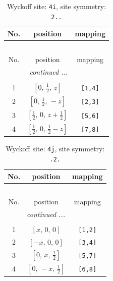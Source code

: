 \documentclass[fleqn,8pt]{jsarticle}
\begin{document}
\renewcommand{\arraystretch}{1.2}
\begin{longtable}{ccc}
\caption{Wyckoff site: {\tt 4i}, site symmetry: {\tt 2..}}
 \\
 \hline \hline
No. & position & mapping \\ \hline \endfirsthead

\multicolumn{2}{l}{\tablename\ \thetable{}} \\
 \hline \hline
No. & position & mapping \\ \hline \endhead

 \hline \hline
\multicolumn{2}{r}{\footnotesize\it continued ...} \\ \endfoot

 \hline \hline
\multicolumn{2}{r}{} \\ \endlastfoot

1 & $\left[ 0,\, \frac{1}{2},\, z \right]$ & {\tt [1,4]} \\ \hline
2 & $\left[ 0,\, \frac{1}{2},\, - z \right]$ & {\tt [2,3]} \\ \hline
3 & $\left[ \frac{1}{2},\, 0,\, z + \frac{1}{2} \right]$ & {\tt [5,6]} \\ \hline
4 & $\left[ \frac{1}{2},\, 0,\, \frac{1}{2} - z \right]$ & {\tt [7,8]} \\
\end{longtable}
\renewcommand{\arraystretch}{1.2}
\begin{longtable}{ccc}
\caption{Wyckoff site: {\tt 4j}, site symmetry: {\tt .2.}}
 \\
 \hline \hline
No. & position & mapping \\ \hline \endfirsthead

\multicolumn{2}{l}{\tablename\ \thetable{}} \\
 \hline \hline
No. & position & mapping \\ \hline \endhead

 \hline \hline
\multicolumn{2}{r}{\footnotesize\it continued ...} \\ \endfoot

 \hline \hline
\multicolumn{2}{r}{} \\ \endlastfoot

1 & $\left[ x,\, 0,\, 0 \right]$ & {\tt [1,2]} \\ \hline
2 & $\left[ - x,\, 0,\, 0 \right]$ & {\tt [3,4]} \\ \hline
3 & $\left[ 0,\, x,\, \frac{1}{2} \right]$ & {\tt [5,7]} \\ \hline
4 & $\left[ 0,\, - x,\, \frac{1}{2} \right]$ & {\tt [6,8]} \\
\end{longtable}
\end{document}
